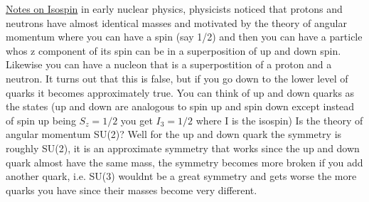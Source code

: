 \documentclass[12pt]{amsart}
\begin{document}
\begin{enumerate}
\underline{Notes on Isospin}
in early nuclear physics, physicists noticed that protons and neutrons have almost identical masses and motivated by the theory of angular momentum where you can have a spin (say 1/2) and then you can have a particle whos z component of its spin can be in a superposition of up and down spin. Likewise you can have a nucleon that is a superpostition of a proton and a neutron. It turns out that this is false, but if you go down to the lower level of quarks it becomes approximately true. You can think of up and down quarks as the states (up and down are analogous to spin up and spin down except instead of spin up being $S_z=1/2$ you get $I_3=1/2$ where I is the isospin) Is the theory of angular momentum SU(2)? Well for the up and down quark the symmetry is roughly SU(2), it is an approximate symmetry that works since the up and down quark almost have the same mass, the symmetry  becomes more broken if you add another quark, i.e. SU(3) wouldnt be a great symmetry and gets worse the more quarks you have since their masses become very different.


\hdashrule[0.5ex][c]{\linewidth}{0.5pt}{1.5mm}



\end{enumerate}
\end{document}
